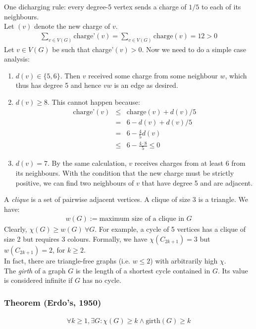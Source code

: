 		One dicharging rule: every degree-5 vertex sends  a charge of $1/5$ to each of its neighbours.\\
		
		Let $(v)$ denote the new charge of $v$. 
		\begin{eqnarray}
			\sum_{v \in V(G)} \text{charge'}(v) = \sum_{v \in V(G)} \text{charge}(v) = 12 > 0
		\end{eqnarray}
		Let $v \in V(G)$ be such that charge'$(v) > 0$. Now we need to do a simple case analysis:
		\begin{enumerate}
			\item $d(v) \in \{ 5,  6 \}$. Then $v$ received some charge from some neighbour $w$, which thus has degree 5 and hence $vw$ is an edge as desired.
			\item $d(v) \geq 8$. This cannot happen because:
				\begin{eqnarray}
					\text{charge'}(v) &\leq&  \text{charge}(v) + d(v)/5\\
					&=& 6 - d(v) + d(v)/5\\
					&=& 6 - \frac{4}{5}d(v)\\
					&\leq& 6 - \frac{4 \cdot 8}{5} \leq 0 
				\end{eqnarray}   
			\item $d(v) = 7$. By the same calculation, $v$ receives charges from at least 6 from its neighbours. With the condition that the new charge must be strictly positive, we can find two neighbours of $v$ that have degree 5 and are adjacent.
		\end{enumerate}
		
	A \textit{clique} is a set of pairwise adjacent vertices. A clique of size 3 is a triangle. We have:
	\begin{eqnarray}
		w(G)  := \text{maximum size of a clique in }G
	\end{eqnarray}
	Clearly, $\chi(G) \geq w(G) ~\forall G$. For example, a cycle of 5 vertices has a clique of size 2 but requires 3 colours. Formally, we have $\chi(C_{2k + 1}) = 3$ but $w(C_{2k + 1}) = 2$, for $k \geq 2$.\\
	
	In fact, there are triangle-free graphs (i.e. $w \leq 2$) with arbitrarily high $\chi$.\\
	
	The \textit{girth} of a graph $G$ is the length of a shortest cycle contained in $G$. Its value is considered infinite if $G$ has no cycle.
	
		\subsubsection{Theorem (Erdo's, 1950)}
		\begin{eqnarray}
			\forall k \geq 1, \exists G : \chi(G) \geq k \wedge \text{girth}(G) \geq k
		\end{eqnarray}
		
